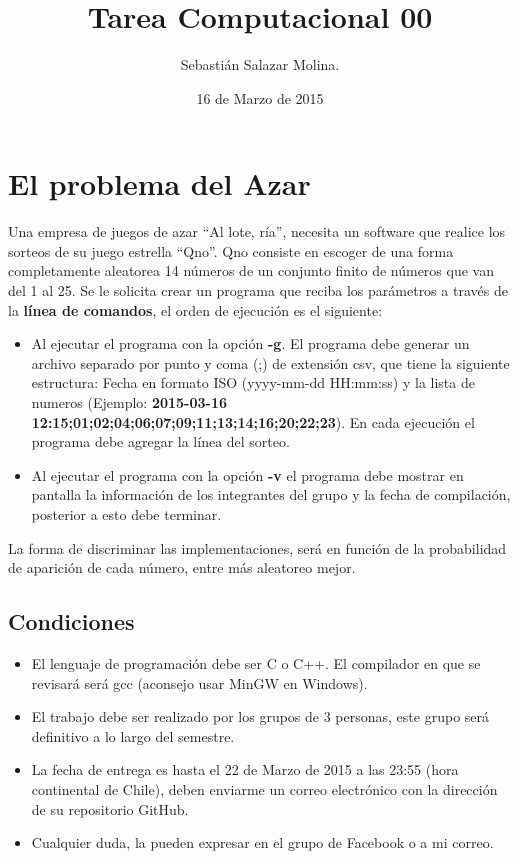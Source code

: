 \documentclass[a4paper,10pt]{article}
\title{Tarea Computacional 00}
\author{Sebastián Salazar Molina.}
\date{16 de Marzo de 2015}
\begin{document}
\maketitle

\section{El problema del Azar}


Una empresa de juegos de azar ``Al lote, ría'', necesita un software que realice los sorteos de su juego estrella ``Qno''.
\newline
Qno consiste en escoger de una forma completamente aleatorea 14 números de un conjunto finito de números que van del 1 al 25.
\newline
Se le solicita crear un programa que reciba los parámetros a través de la {\bf línea de comandos}, el orden de ejecución es el siguiente:
\begin{itemize} 
 \item Al ejecutar el programa con la opción {\bf -g}. El programa debe generar un archivo separado por punto y coma (;) de extensión csv, que tiene la siguiente estructura: Fecha en formato ISO (yyyy-mm-dd HH:mm:ss) y la lista de numeros (Ejemplo: {\bf 2015-03-16 12:15;01;02;04;06;07;09;11;13;14;16;20;22;23}). En cada ejecución el programa debe agregar la línea del sorteo.
 \item Al ejecutar el programa con la opción {\bf -v} el programa debe mostrar en pantalla la información de los integrantes del grupo y la fecha de compilación, posterior a esto debe terminar.
\end{itemize}


La forma de discriminar las implementaciones, será en función de la probabilidad de aparición de cada número, entre más aleatoreo mejor.


\subsection{Condiciones}

\begin{itemize}
 \item El lenguaje de programación debe ser C o C++. El compilador en que se revisará será gcc (aconsejo usar MinGW en Windows).
 \item El trabajo debe ser realizado por los grupos de 3 personas, este grupo será definitivo a lo largo del semestre.
 \item La fecha de entrega es hasta el 22 de Marzo de 2015 a las 23:55 (hora continental de Chile), deben enviarme un correo electrónico con la dirección de su repositorio GitHub.
 \item Cualquier duda, la pueden expresar en el grupo de Facebook o a mi correo.
\end{itemize}
\end{document}
